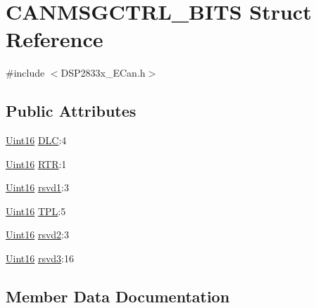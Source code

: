 \hypertarget{struct_c_a_n_m_s_g_c_t_r_l___b_i_t_s}{}\section{C\+A\+N\+M\+S\+G\+C\+T\+R\+L\+\_\+\+B\+I\+T\+S Struct Reference}
\label{struct_c_a_n_m_s_g_c_t_r_l___b_i_t_s}


{\ttfamily \#include $<$D\+S\+P2833x\+\_\+\+E\+Can.\+h$>$}

\subsection*{Public Attributes}
\begin{DoxyCompactItemize}
\item 
\hyperlink{_d_s_p2833x___device_8h_a59a9f6be4562c327cbfb4f7e8e18f08b}{Uint16} \hyperlink{struct_c_a_n_m_s_g_c_t_r_l___b_i_t_s_ab3c0102277b473feeb7f31181108884e}{D\+L\+C}\+:4
\item 
\hyperlink{_d_s_p2833x___device_8h_a59a9f6be4562c327cbfb4f7e8e18f08b}{Uint16} \hyperlink{struct_c_a_n_m_s_g_c_t_r_l___b_i_t_s_adee72d9fcbca6935a8c442d8eea502f2}{R\+T\+R}\+:1
\item 
\hyperlink{_d_s_p2833x___device_8h_a59a9f6be4562c327cbfb4f7e8e18f08b}{Uint16} \hyperlink{struct_c_a_n_m_s_g_c_t_r_l___b_i_t_s_a82f27da459bc87d7d8e6aae1c8e2e387}{rsvd1}\+:3
\item 
\hyperlink{_d_s_p2833x___device_8h_a59a9f6be4562c327cbfb4f7e8e18f08b}{Uint16} \hyperlink{struct_c_a_n_m_s_g_c_t_r_l___b_i_t_s_a079801f8d7f273ae605d40019ad1b0c3}{T\+P\+L}\+:5
\item 
\hyperlink{_d_s_p2833x___device_8h_a59a9f6be4562c327cbfb4f7e8e18f08b}{Uint16} \hyperlink{struct_c_a_n_m_s_g_c_t_r_l___b_i_t_s_abee1c1e6f5d6d3c8ee225c95ee054e4c}{rsvd2}\+:3
\item 
\hyperlink{_d_s_p2833x___device_8h_a59a9f6be4562c327cbfb4f7e8e18f08b}{Uint16} \hyperlink{struct_c_a_n_m_s_g_c_t_r_l___b_i_t_s_af6cc36197d64fa67db97ec6ec04642fb}{rsvd3}\+:16
\end{DoxyCompactItemize}


\subsection{Member Data Documentation}
\hypertarget{struct_c_a_n_m_s_g_c_t_r_l___b_i_t_s_ab3c0102277b473feeb7f31181108884e}{}

